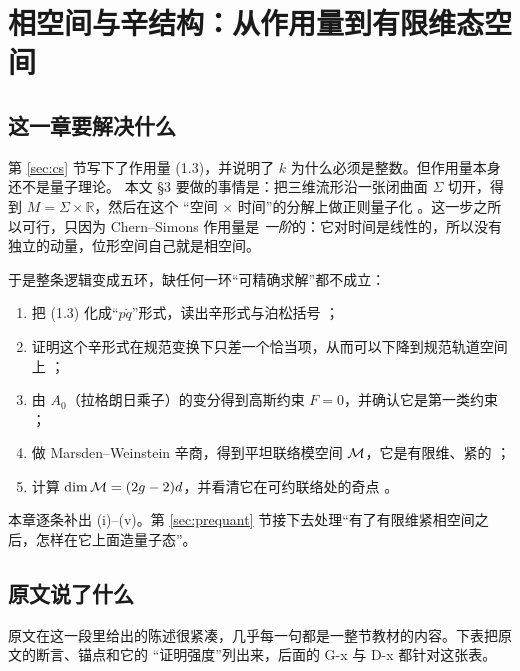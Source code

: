 \section{相空间与辛结构：从作用量到有限维态空间}
\label{sec:canonical}\label{sec:phase}

\subsection{这一章要解决什么}

第 \ref{sec:cs} 节写下了作用量 (1.3)，并说明了 $k$ 为什么必须是整数。但作用量本身还不是量子理论。
本文 §3 要做的事情是：把三维流形沿一张闭曲面 $\Sigma$ 切开，得到 $M=\Sigma\times\mathbb R$，然后在这个
“空间 $\times$ 时间”的分解上做正则量子化 。这一步之所以可行，只因为 Chern--Simons 作用量是
\emph{一阶}的：它对时间是线性的，所以没有独立的动量，位形空间自己就是相空间。

于是整条逻辑变成五环，缺任何一环“可精确求解”都不成立：

\begin{enumerate}[label=(\roman*),leftmargin=2.2em]
\item 把 (1.3) 化成“$p\dot q$”形式，读出辛形式与泊松括号 ；
\item 证明这个辛形式在规范变换下只差一个恰当项，从而可以下降到规范轨道空间上 \ours；
\item 由 $A_0$（拉格朗日乘子）的变分得到高斯约束 $F=0$，并确认它是第一类约束 ；
\item 做 Marsden--Weinstein 辛商，得到平坦联络模空间 $\mathcal{M}$，它是有限维、紧的 ；
\item 计算 $\dim\mathcal{M}=(2g-2)d$，并看清它在可约联络处的奇点 。
\end{enumerate}

本章逐条补出 (i)--(v)。第 \ref{sec:prequant} 节接下去处理“有了有限维紧相空间之后，怎样在它上面造量子态”。

\subsection{原文说了什么}

原文在这一段里给出的陈述很紧凑，几乎每一句都是一整节教材的内容。下表把原文的断言、锚点和它的
“证明强度”列出来，后面的 G-x 与 D-x 都针对这张表。

